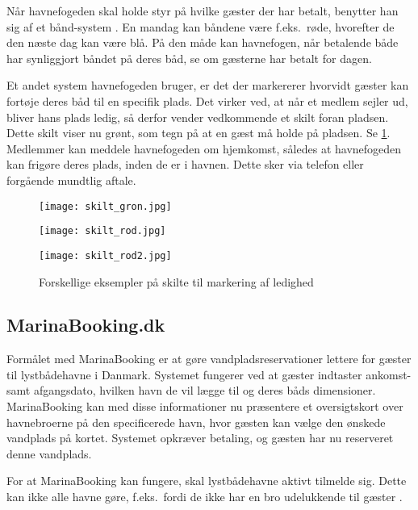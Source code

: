 Når havnefogeden skal holde styr på hvilke gæster der har betalt, benytter han sig af et bånd-system \cite{int_hf}. En mandag kan båndene være f.eks.\ røde, hvorefter de den næste dag kan være blå. På den måde kan havnefogen, når betalende både har synliggjort båndet på deres båd, se om gæsterne har betalt for dagen.

Et andet system havnefogeden bruger, er det der markererer hvorvidt gæster kan fortøje deres båd til en specifik plads. Det virker ved, at når et medlem sejler ud, bliver hans plads ledig, så derfor vender vedkommende et skilt foran pladsen. Dette skilt viser nu grønt, som tegn på at en gæst må holde på pladsen. Se \cref{fig:skilte}. Medlemmer kan meddele havnefogeden om hjemkomst, således at havnefogeden kan frigøre deres plads, inden de er i havnen. Dette sker via telefon eller forgående mundtlig aftale.

\begin{figure}[h]
  \centering
  \begin{minipage}{0.30\textwidth}
    \texttt{[image: skilt\_gron.jpg]}
  \end{minipage}
  \begin{minipage}{0.30\textwidth}
    \texttt{[image: skilt\_rod.jpg]}
  \end{minipage}
  \begin{minipage}{0.30\textwidth}
    \texttt{[image: skilt\_rod2.jpg]}
  \end{minipage}
  \caption{Forskellige eksempler på skilte til markering af ledighed}
  \label{fig:skilte}
\end{figure}

\subsection{MarinaBooking.dk} %
\label{sub:MarinaBooking.dk}

Formålet med MarinaBooking \cite{marinabooking} er at gøre vandpladsreservationer lettere for gæster til lystbådehavne i Danmark. Systemet fungerer ved at gæster indtaster ankomst- samt afgangsdato, hvilken havn de vil lægge til og deres båds dimensioner. MarinaBooking kan med disse informationer nu præsentere et oversigtskort over havnebroerne på den specificerede havn, hvor gæsten kan vælge den ønskede vandplads på kortet. Systemet opkræver betaling, og gæsten har nu reserveret denne vandplads.

For at MarinaBooking kan fungere, skal lystbådehavne aktivt tilmelde sig. Dette kan ikke alle havne gøre, f.eks.\ fordi de ikke har en bro udelukkende til gæster . 

